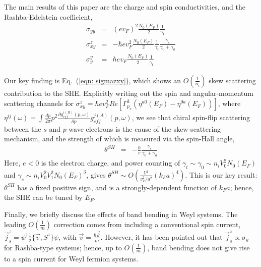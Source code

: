 \documentclass[twocolumn,epsfig,a4paper,amsmath,amssymb,showpacs,prl,superscriptaddress]{revtex4-1}
\newcommand{\ba}{\begin{eqnarray}}
\newcommand{\ea}{\end{eqnarray}}
\newcommand{\dg}{^{\dagger}}
\newcommand{\bl}{\left (}
\newcommand{\br}{\right )}
\begin{document}
The main results of this paper are the charge and spin conductivities, and the Rashba-Edelstein coefficient,
%
\begin{subequations}
\ba
\label{eqn: sigmayy}
 \sigma_{yy} & = & \bl e v_F \br^2 \frac{N_0(E_F)}{2} \frac{1}{\gamma_{t}}  \\
\label{eqn: sigmazxy}
 \sigma^{z}_{xy} & = & - \hbar e v_F^2 \frac{N_0(E_F)}{2} \frac{1}{\gamma_{t}}  \frac{\gamma_{s}}{\gamma_0 + \gamma_a} \\
 \label{eqn: sigmaiy}
\sigma^{y}_{y} & = & \hbar e v_F \frac{N_0(E_F)}{2} \frac{1}{\gamma_{t}} 
\ea
\end{subequations}

Our key finding is Eq.~(\ref{eqn: sigmazxy}), which shows an $O(\tfrac{1}{n_i})$ skew scattering contribution to the SHE. Explicitly writing out the spin and angular-momentum scattering channels for $\sigma^{z}_{xy} = \hbar e v_F^2 Re[\Gamma^3_{p_x} (\eta^{a0}(E_F) - \eta^{0a}(E_F))]$, where $\eta^{ij}(\omega) = \int \tfrac{d p}{2 \pi} p^2 \tfrac{\partial g^{i(R)}_{eff}(p, \omega)}{\partial p} g^{j(A)}_{eff}(p, \omega)$, we see that chiral spin-flip scattering between the $s$ and $p$-wave electrons is the cause of the skew-scattering mechanism, and the strength of which is measured via the spin-Hall angle, 
%
\ba
 \theta^{SH}  & = & -\frac{\hbar}{e} \frac{\gamma_{s}}{\gamma_0 + \gamma_a} 
\ea
%
Here, $e < 0$ is the electron charge, and power counting of  $\gamma_t \sim \gamma_0 \sim n_i V_0^2 N_0(E_F)$ and $\gamma_{s} \sim n_i V_0^2 V_1^2 N_0(E_F)^3$, gives $\theta^{SH} \sim O\left( \tfrac{V^2}{v_F^2/a^2} (k_F a)^4 \right)$. This is our key result: $\theta^{SH}$ has a fixed positive sign, and is a strongly-dependent function of $k_F a$; hence, the SHE can be tuned by $E_F$.

Finally, we briefly discuss the effects of band bending in Weyl systems. The leading $O(\tfrac{1}{m})$ correction comes from including a conventional spin current, $\vec{j}^z_{s} = \psi\dg \tfrac{1}{2} \{\vec{v}, S^z \} \psi$, with $\vec{v} = \tfrac{\hbar \vec{k}}{m}$. However, it has been pointed out\cite{MolenkampPRB2003, HalperinMischenkoPRL2004, NagaosaSugimotoPRB2006} that $\vec{j}^z_{s} \propto \dot{\sigma_y}$ for Rashba-type systems; hence, up to $O(\tfrac{1}{m})$, band bending does not give rise to a spin current for Weyl fermion systems.
\end{document}
